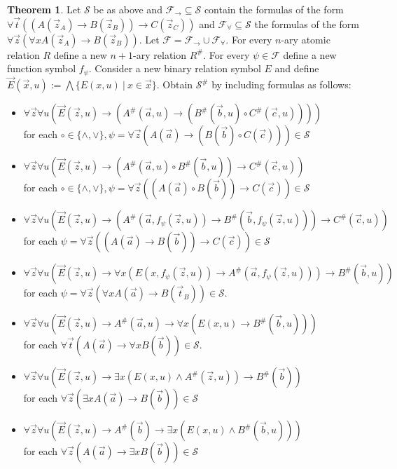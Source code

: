 \documentclass[a4paper,12pt]{report}
\theoremstyle{definition}
\newtheorem{theorem}{Theorem}[section]
\theoremstyle{definition}
\theoremstyle{definition}
\theoremstyle{definition}
\theoremstyle{definition}
\theoremstyle{definition}
\theoremstyle{definition}
\begin{document}
	\begin{theorem}\label{fullFOtranslation}
		Let $\mathcal S$ be as above and $\mathcal F_\to\subseteq\mathcal S$ contain the formulas of the form $\forall \vec t((A(\vec z_A)\to B(\vec z_B))\to C(\vec z_C))$ and $\mathcal F_\forall\subseteq\mathcal S$ the formulas of the form $\forall \vec z(\forall xA(\vec z_A)\to B(\vec z_B))$. Let $\mathcal F = \mathcal F_\to\cup\mathcal F_\forall$. For every $n$-ary atomic relation $R$ define a new $n+1$-ary relation $R^\#$. For every $\psi\in\mathcal F$ define a new function symbol $f_\psi$. Consider a new binary relation symbol $E$ and define $\vec E(\vec x, u) := \bigwedge\{E(x, u)\:|\:x\in\vec x\}$. Obtain $\mathcal S^\#$ by including formulas as follows:
		\begin{itemize}
			\item $\forall \vec z\forall u(\vec E(\vec z, u)\to (A^\#(\vec a, u)\to (B^\#(\vec b, u)\circ C^\#(\vec c, u))))$\\for each $\circ\in\{\wedge, \vee\}, \psi = \forall \vec z(A(\vec a)\to (B(\vec b)\circ C(\vec c)))\in\mathcal S$
			\item $\forall \vec z\forall u(\vec E(\vec z, u)\to (A^\#(\vec a, u)\circ B^\#(\vec b, u))\to C^\#(\vec c, u))$\\for each $\circ\in\{\wedge, \vee\}, \psi = \forall \vec z((A(\vec a)\circ B(\vec b))\to C(\vec c))\in\mathcal S$
			\item $\forall \vec z\forall u(\vec E(\vec z, u)\to(A^\#(\vec a, f_\psi(\vec z, u))\to B^\#(\vec b, f_\psi(\vec z, u)))\to C^\#(\vec c, u))$\\for each $\psi = \forall \vec z((A(\vec a)\to B(\vec b))\to C(\vec c))\in\mathcal S$
			\item  $\forall \vec z\forall u(\vec E(\vec z, u)\to \forall x(E(x, f_\psi(\vec z, u))\to A^\#(\vec a, f_\psi(\vec z, u)))\to B^\#(\vec b, u))$\\for each $\psi = \forall \vec z(\forall xA(\vec a)\to B(\vec t_B))\in\mathcal S$.
			\item $\forall \vec z\forall u(\vec E(\vec z, u)\to A^\#(\vec a, u)\to \forall x(E(x, u)\to B^\#(\vec b, u)))$\\for each $\forall \vec t(A(\vec a)\to \forall xB(\vec b))\in\mathcal S$.
			\item $\forall \vec z\forall u(\vec E(\vec z, u)\to \exists x(E(x, u)\wedge A^\#(\vec z, u))\to B^\#(\vec b))$\\for each $\forall \vec z(\exists xA(\vec a)\to B(\vec b))\in\mathcal S$
			\item $\forall \vec z\forall u(\vec E(\vec z, u)\to A^\#(\vec b)\to \exists x(E(x, u)\wedge B^\#(\vec b, u)))$\\for each $\forall \vec z(A(\vec a)\to \exists xB(\vec b))\in\mathcal S$

\end{itemize}
\end{theorem}
\end{document}
